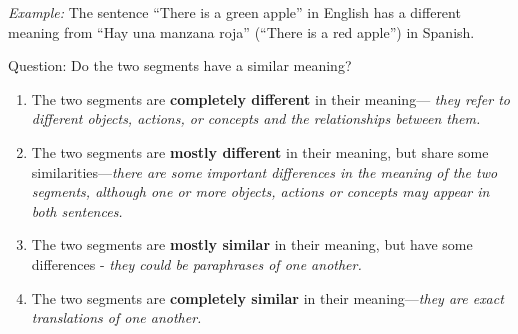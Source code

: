 \begin{boxA}
\textit{Example:}
The sentence “There is a green apple” in English has a different meaning from “Hay una manzana roja” (“There is a red apple”) in Spanish.
\end{boxA}

Question: Do the two segments have a similar meaning?
\begin{enumerate}
    \item The two segments are \textbf{completely different} in their meaning— \textit{they refer to different objects, actions, or concepts and the relationships between them.}
    \item The two segments are \textbf{mostly different} in their meaning, but share some similarities—\textit{there are some important differences in the meaning of the two segments, although one or more objects, actions or concepts may appear in both sentences.}
    \item The two segments are \textbf{mostly similar} in their meaning, but have some differences - \textit{they could be paraphrases of one another.}
    \item The two segments are \textbf{completely similar} in their meaning—\textit{they are exact translations of one another.}
\end{enumerate}

